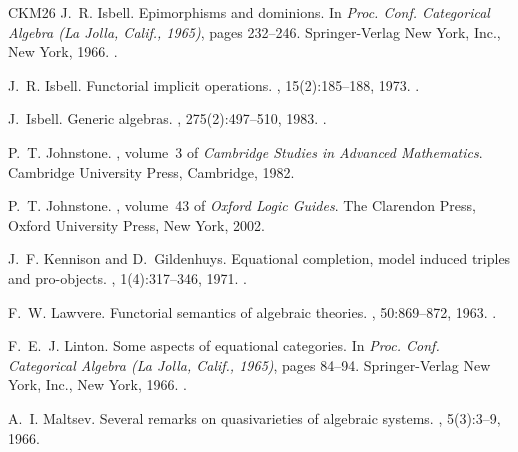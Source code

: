\documentclass[a4paper,10pt,reqno]{amsart}
\theoremstyle{definition}
\theoremstyle{remark}
\begin{document}
\begin{thebibliography}{CKM26}
J.~R. Isbell.
\newblock Epimorphisms and dominions.
\newblock In {\em Proc. {C}onf. {C}ategorical {A}lgebra ({L}a {J}olla,
  {C}alif., 1965)}, pages 232--246. Springer-Verlag New York, Inc., New York,
  1966.
\newblock \href {https://doi.org/10.1007/978-3-642-99902-4_9}
  {}.

J.~R. Isbell.
\newblock Functorial implicit operations.
, 15(2):185--188, 1973.
\newblock \href {https://doi.org/10.1007/BF02764604}
  {}.

J.~Isbell.
\newblock Generic algebras.
, 275(2):497--510, 1983.
\newblock \href {https://doi.org/10.2307/1999036} {}.

P.~T. Johnstone.
, volume~3 of {\em Cambridge Studies in Advanced
  Mathematics}.
\newblock Cambridge University Press, Cambridge, 1982.

P.~T. Johnstone.
,
  volume~43 of {\em Oxford Logic Guides}.
\newblock The Clarendon Press, Oxford University Press, New York, 2002.

J.~F. Kennison and D.~Gildenhuys.
\newblock Equational completion, model induced triples and pro-objects.
, 1(4):317--346, 1971.
\newblock \href {https://doi.org/10.1016/0022-4049(71)90001-6}
  {}.

F.~W. Lawvere.
\newblock Functorial semantics of algebraic theories.
, 50:869--872, 1963.
\newblock \href {https://doi.org/10.1073/pnas.50.5.869}
  {}.

F.~E.~J. Linton.
\newblock Some aspects of equational categories.
\newblock In {\em Proc. {C}onf. {C}ategorical {A}lgebra ({L}a {J}olla,
  {C}alif., 1965)}, pages 84--94. Springer-Verlag New York, Inc., New York,
  1966.
\newblock \href {https://doi.org/10.1007/978-3-642-99902-4_3}
  {}.

A.~I. Maltsev.
\newblock Several remarks on quasivarieties of algebraic systems.
, 5(3):3--9, 1966.


\end{thebibliography}
\end{document}
